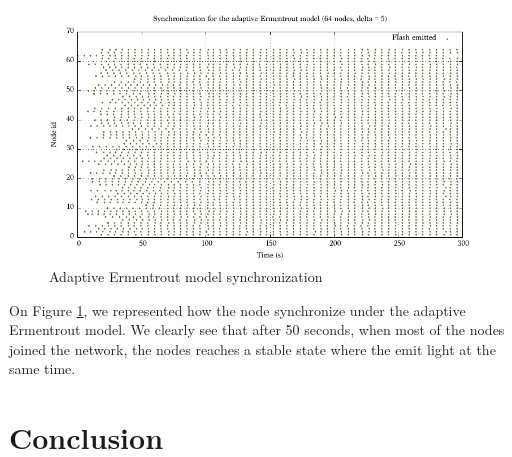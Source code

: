 \documentclass[a4paper, 11pt]{article}
\theoremstyle{plain}
\theoremstyle{definition}
\begin{document}
     \begin{figure}[h]
       \centering
       \includegraphics[scale=0.8]{../Plots/Firefly-er-64nodes-d5-2.pdf}
       \caption{Adaptive Ermentrout model synchronization}
       \label{fig:er-sync}
     \end{figure}


     On Figure \ref{fig:er-sync}, we represented how the node synchronize under the adaptive Ermentrout
     model. We clearly see that after 50 seconds, when most of the nodes joined the network, the nodes reaches
     a stable state where the emit light at the same time.

     



\section{Conclusion}
\label{sec:conclusion}

  



    
    
    












	
\end{document}
